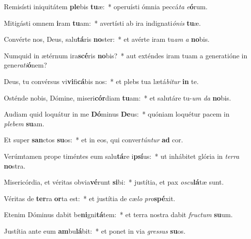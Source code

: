 \item Remisísti iniquitátem \textbf{ple}bis \textbf{tu}æ:~* operuísti ómnia peccá\textit{ta} \textit{e}\textbf{ó}rum.
\item Mitigásti omnem \textbf{i}ram \textbf{tu}am:~* avertísti ab ira indignati\textit{ónis} \textbf{tu}æ.
\item Convérte nos, Deus, salu\textbf{tá}ris \textbf{no}ster:~* et avérte iram tu\tinyhspace\textit{am} \textit{a} \textbf{no}bis.
\item Numquid in ætérnum ira\textbf{scé}ris \textbf{no}bis?~* aut exténdes iram tuam a generatióne in gene\textit{rati}\textbf{ó}nem?
\item Deus, tu convérsus vi\textbf{vi}fi\textbf{cá}bis nos:~* et plebs tua lætá\textit{bitur} \textbf{in} te.
\item Osténde nobis, Dómine, miseri\textbf{cór}diam \textbf{tu}am:~* et salutáre tu-\tinyhspace\textit{um} \textit{da} \textbf{no}bis.
\item Audiam quid loquátur in me \textbf{Dó}minus \textbf{De}us:~* quóniam loquétur pacem in \textit{plebem} \textbf{su}am.
\item Et super \textbf{san}ctos \textbf{su}os:~* et in eos, qui conver\textit{túntur} \textbf{ad} cor.
\item Verúmtamen prope timéntes eum salu\textbf{tá}re i\textbf{psí}us:~* ut inhábitet glória in \textit{terra} \textbf{no}stra.
\item Misericórdia, et véritas obvia\textbf{vé}runt \textbf{si}bi:~* justítia, et pax \textit{oscu}\textbf{lá}tæ sunt.
\item Véritas de \textbf{ter}ra \textbf{or}ta est:~* et justítia de cæ\textit{lo} \textit{pro}\textbf{spé}xit.
\item Etenim Dóminus dabit be\textbf{ni}gni\textbf{tá}tem:~* et terra nostra dabit \textit{fru\-ctum} \textbf{su}um.
\item Justítia ante eum \textbf{am}bu\textbf{lá}bit:~* et ponet in via \textit{gressus} \textbf{su}os.
